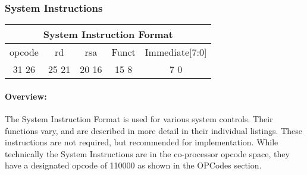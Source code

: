 \documentclass[letterpaper, 11pt]{article}
\begin{document}
\newpage
\subsubsection{System Instructions}
\begin{center}
	\begin{tabular}{|c|c|c|c|c|}
		\multicolumn{5}{c}{System Instruction Format}\\ \hline
			\hspace{2pt} opcode \hspace{2pt} & \hspace{5pt} rd \hspace{5pt} &  \hspace{4pt} rsa \hspace{4pt} & \hspace{10pt}Funct  \hspace{10pt} & \hspace{8pt} Immediate[7:0] \hspace{8pt}   \\	\hline
		31 \hfill 26& 25 \hfill 21 &20 \hfill  16& 15 \hfill  8&7 \hfill   0\\ \hline
		
	\end{tabular}
\end{center}
\paragraph{Overview:} The System Instruction Format is used for various system controls. Their functions
vary, and are described in more detail in their individual listings.
These instructions are not required, but recommended for implementation.
While technically the System Instructions are in the co-processor opcode space, they have
a designated opcode of 110000 as shown in the OPCodes section.
\end{document}
